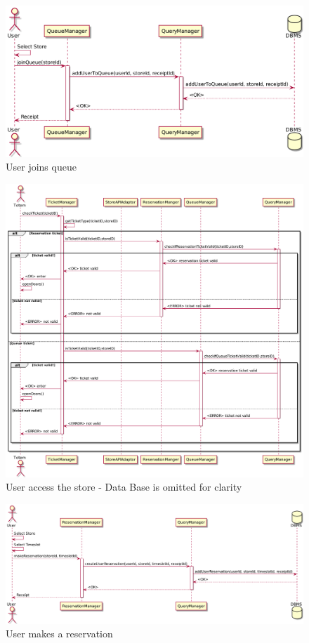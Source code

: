 \begin{figure}[H]
    \includegraphics[width=\linewidth]{uml/seq_join_queue.png}
    \caption{User joins queue}
    \label{fig:seq_join_queue}
\end{figure}


\begin{figure}[H]
    \includegraphics[width=\linewidth]{uml/seq_user_enters_store.png}
    \caption{User access the store - Data Base is omitted for clarity}
    \label{fig:seq_user_access_store}
\end{figure}

\begin{figure}[H]
    \includegraphics[width=\linewidth]{uml/seq_make_reservation.png}
    \caption{User makes a reservation}
    \label{fig:seq_make_reservation}
\end{figure}
 
